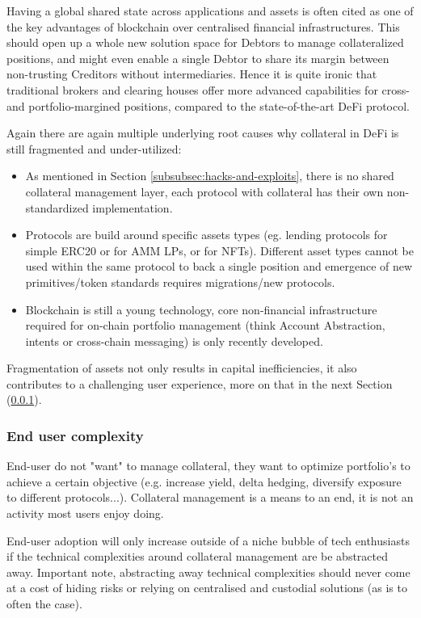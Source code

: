 \documentclass[sigconf,nonacm]{acmart}
\begin{document}
Having a global shared state across applications and assets is often cited as one of the key advantages of blockchain over centralised financial infrastructures\cite{schar2021decentralized}.
This should open up a whole new solution space for Debtors to manage collateralized positions, 
and might even enable a single Debtor to share its margin between non-trusting Creditors without intermediaries.
Hence it is quite ironic that traditional brokers and clearing houses offer more advanced capabilities for cross- and portfolio-margined positions, compared to the state-of-the-art DeFi protocol.

Again there are again multiple underlying root causes why collateral in DeFi is still fragmented and under-utilized:
\begin{itemize}
    \item As mentioned in Section \ref{subsubsec:hacks-and-exploits}, there is no shared collateral management layer, each protocol with collateral has their own non-standardized implementation.
    \item Protocols are build around specific assets types (eg. lending protocols for simple ERC20 or for AMM LPs, or for NFTs). 
    Different asset types cannot be used within the same protocol to back a single position and emergence of new primitives/token standards requires migrations/new protocols.
    \item Blockchain is still a young technology, core non-financial infrastructure required for on-chain portfolio management (think Account Abstraction, intents or cross-chain messaging) is only recently developed. 
\end{itemize}

Fragmentation of assets not only results in capital inefficiencies, it also contributes to a challenging user experience, more on that in the next Section (\ref{subsubsec:end-user-complexity}).

\subsubsection{End user complexity}
\label{subsubsec:end-user-complexity}

End-user do not "want" to manage collateral, they want to optimize portfolio's to achieve a certain objective (e.g. increase yield, delta hedging, diversify exposure to different protocols...).
Collateral management is a means to an end, it is not an activity most users enjoy doing.

End-user adoption will only increase outside of a niche bubble of tech enthusiasts if the technical complexities around collateral management are be abstracted away.
Important note, abstracting away technical complexities should never come at a cost of hiding risks or relying on centralised and custodial solutions (as is to often the case).
\end{document}
